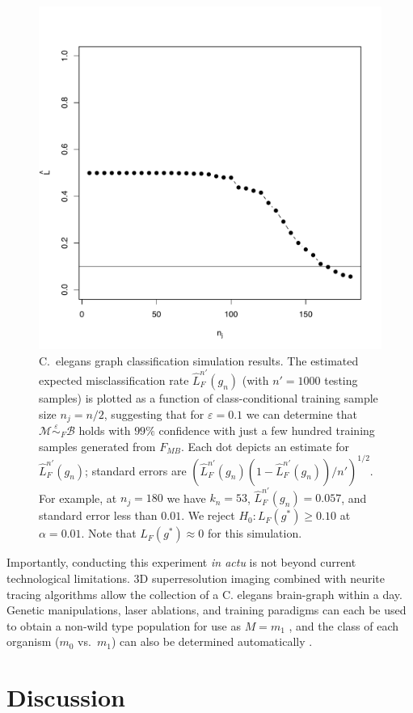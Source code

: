 \documentclass{article}
\newcommand{\mB}{\mathcal{B}}
\newcommand{\mM}{\mathcal{M}}
\newcommand{\PP}{\mathbb{P}}           %
\providecommand{\mt}[1]{\widetilde{#1}}
\newcommand{\hL}{\widehat{L}}
\newcommand{\MeB}{\mM \overset{\varepsilon}{{\sim}}_{F} \mB}
\begin{document}
\begin{figure}[!ht]
\centering 
\includegraphics[width=.5\linewidth]{Lhatplot}
\caption{C.~elegans graph classification simulation results.  The estimated expected misclassification rate $\hL^{n'}_{F}(g_{n})$  (with $n'=1000$ testing samples) %
is plotted as a function of class-conditional training sample size $n_j=n/2$, suggesting that for $\varepsilon=0.1$ we can determine that $\MeB$ holds with $99\%$ confidence with just a few hundred training samples generated from $F_{MB}$. Each dot depicts an estimate for $\hL^{n'}_{F}(g_n)$; standard errors are $(\hL^{n'}_{F}(g_{n}) (1-\hL^{n'}_{F}(g_{n}))/n')^{1/2}$.  For example, at $n_j = 180$ we have $k_n = 53$, $\hL^{n'}_{F}(g_{n}) = 0.057$, and standard error less than $0.01$. We reject $H_0: L_{F}(g^*) \geq 0.10$ at $\alpha=0.01$. Note that $L_{F}(g^*) \approx 0$ for this simulation.}
\label{fig1}
\end{figure}

Importantly, conducting this experiment {\it in actu} is not beyond current technological limitations. 3D superresolution imaging \cite{Vaziri2008} combined with neurite tracing algorithms \cite{Helmstaedter2008,Mishchenko09,LuLichtman09} allow the collection of a C. elegans brain-graph within a day. Genetic manipulations, laser ablations, and training paradigms can each be used to obtain a non-wild type population for use as $M=m_1$ \cite{deBonoMaricq05}, and the class of each organism ($m_0$ vs.~$m_1$) can also be determined automatically \cite{Buckingham2008}.





\section*{Discussion}

\end{document}
